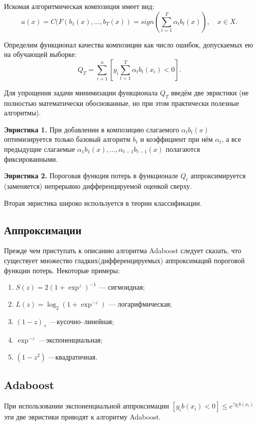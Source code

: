 \documentclass{article}
\renewcommand{\leq}{\leqslant}
\theoremstyle{definition}
\theoremstyle{theorem}
\theoremstyle{remark}
\theoremstyle{theorem}
\theoremstyle{example}
\theoremstyle{theorem}
\theoremstyle{theorem}
\theoremstyle{theorem}
\theoremstyle{theorem}
\begin{document}
Искомая алгоритмическая композиция имеет вид:
\begin{equation}\label{eq_3}
	a(x) = C(F(b_1(x), \ldots , b_T (x)) = sign \left(\sum_{t=1}^{T} \alpha_t b_t(x) \right), \quad x \in X.
\end{equation}

Определим функционал качества композиции как число ошибок, допускаемых ею на обучающей выборке:
\begin{equation}\label{eq_4}
	Q_T =\sum_{i=1}^{n}\left[y_i \sum_{t=1}^{T} \alpha_t b_t(x_i) < 0\right].
\end{equation}

Для упрощения задачи минимизации функционала $Q_T$ введём две эвристики (не полностью математически обоснованные, но при этом практически полезные алгоритмы).
\vspace{0.2cm}

\textbf{Эвристика 1.} При добавлении в композицию слагаемого $\alpha_t b_t(x)$ оптимизируется только базовый алгоритм $b_t$ и коэффициент при нём $\alpha_t$, а все предыдущие слагаемые $\alpha_1 b_1(x), \ldots, \alpha_{t-1} b_{t-1}(x)$ полагаются фиксированными.
\vspace{0.2cm}

\textbf{Эвристика 2.} Пороговая функция потерь в функционале $Q_t$ аппроксимируется (заменяется) непрерывно дифференцируемой оценкой сверху.
\vspace{0.2cm}

Вторая эвристика широко используется в теории классификации.

\subsection{Аппроксимации}
Прежде чем приступать к описанию алгоритма Adaboost следует сказать, что существует множество гладких(дифференцируемых) аппроксимаций пороговой функции потерь. Некоторые примеры:
\begin{enumerate}
	\item $S(z) = 2(1+\exp^z)^{-1}$ --- сигмоидная;
	\item $L(z) = \log_{2}(1+\exp^{-z})$ --- логарифмическая;
	\item $(1-z)_+$ ---кусочно--линейная;
	\item $\exp^{-z}$ ---экспоненциальная;
	\item $(1-z^2)$ ---квадратичная.
\end{enumerate}

\subsection{Adaboost}
При использовании экспоненциальной аппроксимации $[y_i b(x_i) < 0] \leq e^{?y_i b(x_i)}$ эти две эвристики приводят к алгоритму Adaboost.
\vspace{0.2cm}
\end{document}
